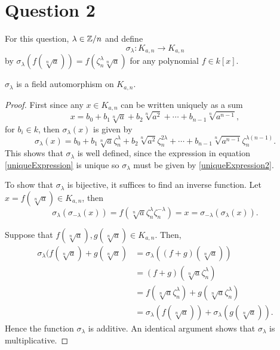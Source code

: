 \documentclass{unswmaths}
\begin{document}
\section*{Question 2}
For this question, $\lambda \in \mathbb{Z}/n$ and
define
\begin{equation*}
\sigma_\lambda: K_{a,n}\rightarrow K_{a,n}
\end{equation*}
by $\sigma_{\lambda}(f(\sqrt[n]{a})) = f(\zeta_n^\lambda \sqrt[n]{a})$
for any polynomial $f \in k[x]$.
\begin{theorem}
$\sigma_\lambda$ is a field automorphism on $K_{a,n}$.
\end{theorem}
\begin{proof}
First since any $x \in K_{a,n}$
can be written uniquely as a sum
\begin{equation}
\label{uniqueExpression}
x = b_0 + b_1\sqrt[n]{a}+b_2\sqrt[n]{a^2} + \cdots + b_{n-1}\sqrt[n]{a^{n-1}},
\end{equation}
for $b_i \in k$, then $\sigma_\lambda(x)$ is given by
\begin{equation}
\label{uniqueExpression2}
\sigma_\lambda(x) = b_0 + b_1\sqrt[n]{a}\zeta_n^\lambda+b_2\sqrt[n]{a^2}\zeta_n^{2\lambda}+\cdots+b_{n-1}\sqrt[n]{a^{n-1}}\zeta_n^{\lambda(n-1)}.
\end{equation}
This shows that $\sigma_\lambda$ is well defined, since the expression in equation \ref{uniqueExpression}
is unique so $\sigma_\lambda$ must be given by \ref{uniqueExpression2}. 

To show that $\sigma_\lambda$ is bijective, it suffices to find an inverse function.
Let $x = f(\sqrt[n]{a}) \in K_{a,n}$, then
\begin{equation*}
    \sigma_{\lambda}(\sigma_{-\lambda}(x)) = f(\sqrt[n]{a}\zeta_n^{\lambda}\zeta_n^{-\lambda}) = x = \sigma_{-\lambda}(\sigma_\lambda(x)).
\end{equation*}

Suppose that $f(\sqrt[n]{a}),g(\sqrt[n]{a}) \in K_{a,n}$. Then,
\begin{align*}
\sigma_{\lambda}(f(\sqrt[n]{a})+g(\sqrt[n]{a}) &= \sigma_\lambda((f+g)(\sqrt[n]{a}))\\
&= (f+g)(\sqrt[n]{a}\zeta_n^\lambda)\\
&= f(\sqrt[n]{a}\zeta_n^\lambda) + g(\sqrt[n]{a}\zeta_n^\lambda)\\
&= \sigma_\lambda(f(\sqrt[n]{a}))+\sigma_\lambda(g(\sqrt[n]{a})).
\end{align*}
Hence the function $\sigma_\lambda$ is additive. An identical argument shows that $\sigma_\lambda$
is multiplicative.



\end{proof}
\end{document}
